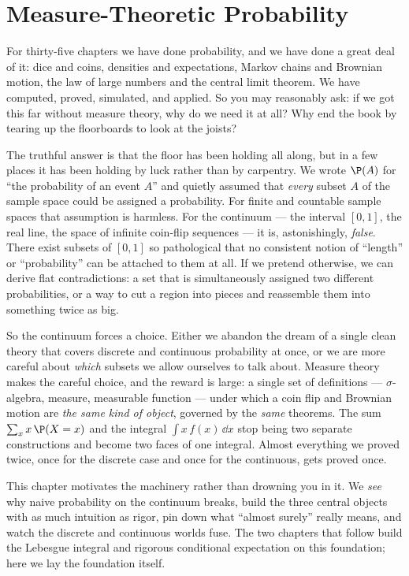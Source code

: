 \chapter{Measure-Theoretic Probability}

For thirty-five chapters we have done probability, and we have done a great deal
of it: dice and coins, densities and expectations, Markov chains and Brownian
motion, the law of large numbers and the central limit theorem. We have computed,
proved, simulated, and applied. So you may reasonably ask: if we got this far
without measure theory, why do we need it at all? Why end the book by tearing up
the floorboards to look at the joists?

The truthful answer is that the floor has been holding all along, but in a few
places it has been holding by luck rather than by carpentry. We wrote
$\P(A)$ for ``the probability of an event $A$'' and quietly assumed that
\emph{every} subset $A$ of the sample space could be assigned a probability. For
finite and countable sample spaces that assumption is harmless. For the
continuum --- the interval $[0,1]$, the real line, the space of infinite coin-flip
sequences --- it is, astonishingly, \emph{false}. There exist subsets of
$[0,1]$ so pathological that no consistent notion of ``length'' or ``probability''
can be attached to them at all. If we pretend otherwise, we can derive flat
contradictions: a set that is simultaneously assigned two different probabilities,
or a way to cut a region into pieces and reassemble them into something twice as
big.

So the continuum forces a choice. Either we abandon the dream of a single clean
theory that covers discrete and continuous probability at once, or we are more
careful about \emph{which} subsets we allow ourselves to talk about. Measure
theory makes the careful choice, and the reward is large: a single set of
definitions --- $\sigma$-algebra, measure, measurable function --- under which a
coin flip and Brownian motion are \emph{the same kind of object}, governed by the
\emph{same} theorems. The sum $\sum_x x\,\P(X=x)$ and the integral
$\int x\,f(x)\,\dd x$ stop being two separate constructions and become two faces of
one integral. Almost everything we proved twice, once for the discrete case and
once for the continuous, gets proved once.

This chapter motivates the machinery rather than drowning you in it. We
\emph{see} why naive probability on the continuum breaks, build the three central
objects with as much intuition as rigor, pin down what ``almost surely'' really
means, and watch the discrete and continuous worlds fuse. The two chapters that
follow build the Lebesgue integral and rigorous conditional expectation on this
foundation; here we lay the foundation itself.

